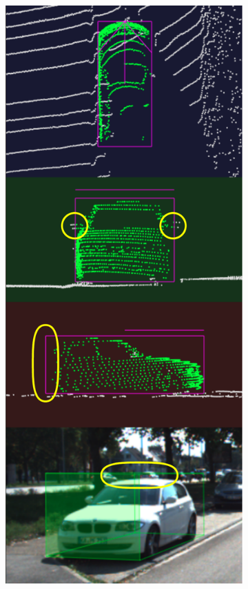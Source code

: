 \documentclass[letterpaper, 10 pt, conference]{ieeeconf}  %
\begin{document}
\begin{figure}
	\centering
	\begin{subfigure}{0.3\linewidth}
		\includegraphics[scale=0.2]{./figures/annocheck-0}
		\caption{}
	\end{subfigure}

\end{figure}
\end{document}
